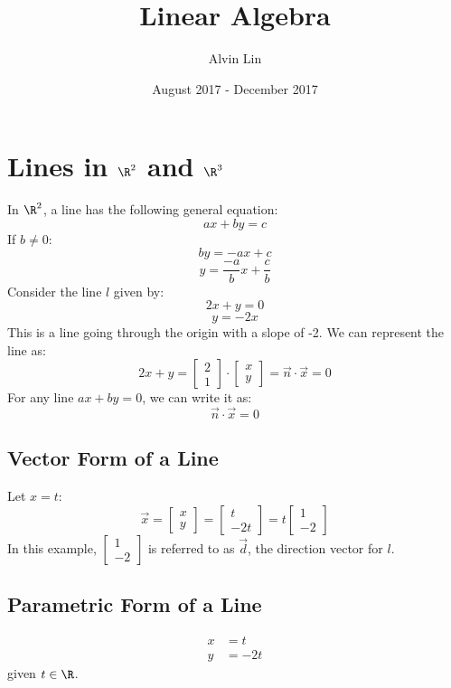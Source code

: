 \documentclass[letterpaper, 12pt]{math}
\title{Linear Algebra}
\author{Alvin Lin}
\date{August 2017 - December 2017}
\begin{document}
\maketitle

\section*{Lines in \( \R^2 \) and \( \R^3 \)}
In \( \R^2 \), a line has the following general equation:
\[ ax+by = c \]
If \( b \ne 0 \):
\[ by = -ax+c \]
\[ y = \frac{-a}{b}x+\frac{c}{b} \]
Consider the line \( l \) given by:
\[ 2x+y = 0 \]
\[ y = -2x \]
This is a line going through the origin with a slope of -2. We can represent
the line as:
\[ 2x+y = \begin{bmatrix}2 \\ 1\end{bmatrix}\cdot
  \begin{bmatrix}x \\ y\end{bmatrix} = \vec{n}\cdot\vec{x} = 0 \]
For any line \( ax+by = 0 \), we can write it as:
\[ \vec{n}\cdot\vec{x} = 0 \]

\subsection*{Vector Form of a Line}
Let \( x = t \):
\[ \vec{x} = \begin{bmatrix}x \\ y\end{bmatrix} =
  \begin{bmatrix}t \\ -2t\end{bmatrix} = t\begin{bmatrix}1 \\-2\end{bmatrix} \]
In this example, \( \begin{bmatrix}1 \\ -2\end{bmatrix} \) is referred to as
\( \vec{d} \), the direction vector for \( l \).

\subsection*{Parametric Form of a Line}
\begin{align*}
  x &= t \\
  y &= -2t
\end{align*}
given \( t\in\R \).
\end{document}
